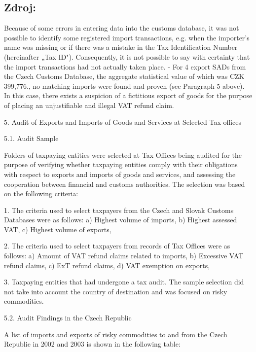 \documentclass[10pt]{article}
\begin{document}
\subsection*{Zdroj:}

Because of some errors in entering data into the customs database, it was not possible to identify some registered import transactions, e.g. when the importer's name was missing or if there was a mistake in the Tax Identification Number (hereinafter „Tax ID").
Consequently, it is not possible to say with certainty that the import transactions had not actually taken place.
- For 4 export SADs from the Czech Customs Database, the aggregate statistical value of which was CZK 399,776., no matching imports were found and proven (see Paragraph 5 above).
In this case, there exists a suspicion of a fictitious export of goods for the purpose of placing an unjustifiable and illegal VAT refund claim.


5. Audit of Exports and Imports of Goods and Services at Selected Tax offices



5.1. Audit Sample



Folders of taxpaying entities were selected at Tax Offices being audited for the purpose of verifying whether taxpaying entities comply with their obligations with respect to exports and imports of goods and services, and assessing the cooperation between financial and customs authorities. The selection was based on the following criteria:



1. The criteria used to select taxpayers from the Czech and Slovak Customs Databases were as follows: a) Highest volume of imports, b) Highest assessed VAT, c) Highest volume of exports,



2. The criteria used to select taxpayers from records of Tax Offices were as follows: a) Amount of VAT refund claims related to imports, b) Excessive VAT refund claims, c) ExT refund claims, d) VAT exemption on exports,

3. Taxpaying entities that had undergone a tax audit.
The sample selection did not take into account the country of destination and was focused on risky commodities.


5.2. Audit Findings in the Czech Republic



A list of imports and exports of risky commodities to and from the Czech Republic in 2002 and 2003 is shown in the following table:
\end{document}
